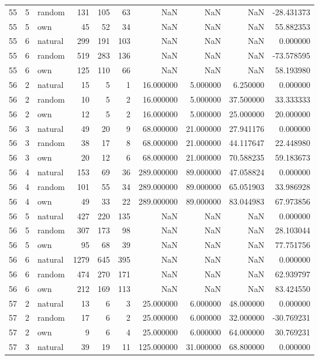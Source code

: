 \begin{table}[htbp]
\begin{tabular}{rrlrrrrrrr}
55 & 5 & random & 131 & 105 & 63 & NaN & NaN & NaN & -28.431373 \\
55 & 5 & own & 45 & 52 & 34 & NaN & NaN & NaN & 55.882353 \\
55 & 6 & natural & 299 & 191 & 103 & NaN & NaN & NaN & 0.000000 \\
55 & 6 & random & 519 & 283 & 136 & NaN & NaN & NaN & -73.578595 \\
55 & 6 & own & 125 & 110 & 66 & NaN & NaN & NaN & 58.193980 \\
56 & 2 & natural & 15 & 5 & 1 & 16.000000 & 5.000000 & 6.250000 & 0.000000 \\
56 & 2 & random & 10 & 5 & 2 & 16.000000 & 5.000000 & 37.500000 & 33.333333 \\
56 & 2 & own & 12 & 5 & 2 & 16.000000 & 5.000000 & 25.000000 & 20.000000 \\
56 & 3 & natural & 49 & 20 & 9 & 68.000000 & 21.000000 & 27.941176 & 0.000000 \\
56 & 3 & random & 38 & 17 & 8 & 68.000000 & 21.000000 & 44.117647 & 22.448980 \\
56 & 3 & own & 20 & 12 & 6 & 68.000000 & 21.000000 & 70.588235 & 59.183673 \\
56 & 4 & natural & 153 & 69 & 36 & 289.000000 & 89.000000 & 47.058824 & 0.000000 \\
56 & 4 & random & 101 & 55 & 34 & 289.000000 & 89.000000 & 65.051903 & 33.986928 \\
56 & 4 & own & 49 & 33 & 22 & 289.000000 & 89.000000 & 83.044983 & 67.973856 \\
56 & 5 & natural & 427 & 220 & 135 & NaN & NaN & NaN & 0.000000 \\
56 & 5 & random & 307 & 173 & 98 & NaN & NaN & NaN & 28.103044 \\
56 & 5 & own & 95 & 68 & 39 & NaN & NaN & NaN & 77.751756 \\
56 & 6 & natural & 1279 & 645 & 395 & NaN & NaN & NaN & 0.000000 \\
56 & 6 & random & 474 & 270 & 171 & NaN & NaN & NaN & 62.939797 \\
56 & 6 & own & 212 & 169 & 113 & NaN & NaN & NaN & 83.424550 \\
57 & 2 & natural & 13 & 6 & 3 & 25.000000 & 6.000000 & 48.000000 & 0.000000 \\
57 & 2 & random & 17 & 6 & 2 & 25.000000 & 6.000000 & 32.000000 & -30.769231 \\
57 & 2 & own & 9 & 6 & 4 & 25.000000 & 6.000000 & 64.000000 & 30.769231 \\
57 & 3 & natural & 39 & 19 & 11 & 125.000000 & 31.000000 & 68.800000 & 0.000000 \\

\end{tabular}
\end{table}
